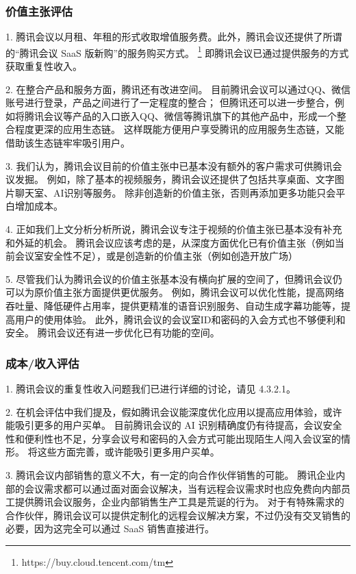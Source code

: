 \documentclass[a4paper,12pt]{article}
\begin{document}
    \subsubsection{价值主张评估}

    1.
    腾讯会议以月租、年租的形式收取增值服务费。此外，腾讯会议还提供了所谓的“腾讯会议 SaaS 版新购”的服务购买方式。
    \footnote{https://buy.cloud.tencent.com/tm}
    即腾讯会议已通过提供服务的方式获取重复性收入。

    2.
    在整合产品和服务方面，腾讯还有改进空间。
    目前腾讯会议可以通过QQ、微信账号进行登录，产品之间进行了一定程度的整合；
    但腾讯还可以进一步整合，例如将腾讯会议等产品的入口嵌入QQ、微信等腾讯旗下的其他产品中，形成一个整合程度更深的应用生态链。
    这样既能方便用户享受腾讯的应用服务生态链，又能借助该生态链牢牢吸引用户。

    3.
    我们认为，腾讯会议目前的价值主张中已基本没有额外的客户需求可供腾讯会议发掘。
    例如，除了基本的视频服务，腾讯会议还提供了包括共享桌面、文字图片聊天室、AI识别等服务。
    除非创造新的价值主张，否则再添加更多功能只会平白增加成本。

    4.
    正如我们上文分析分析所说，腾讯会议专注于视频的价值主张已基本没有补充和外延的机会。
    腾讯会议应该考虑的是，从深度方面优化已有价值主张（例如当前会议室安全性不足），或是创造新的价值主张（例如创造开放广场）

    5.
    尽管我们认为腾讯会议的价值主张基本没有横向扩展的空间了，但腾讯会议仍可以为原价值主张方面提供更优服务。
    例如，腾讯会议可以优化性能，提高网络吞吐量、降低硬件占用率，提供更精准的语音识别服务、自动生成字幕功能等，提高用户的使用体验。
    此外，腾讯会议的会议室ID和密码的入会方式也不够便利和安全。
    腾讯会议还有进一步优化已有功能的空间。

    \subsubsection{成本/收入评估}

    1.
    腾讯会议的重复性收入问题我们已进行详细的讨论，请见 4.3.2.1。

    2.
    在机会评估中我们提及，假如腾讯会议能深度优化应用以提高应用体验，或许能吸引更多的用户买单。
    目前腾讯会议的 AI 识别精确度仍有待提高，会议安全性和便利性也不足，分享会议号和密码的入会方式可能出现陌生人闯入会议室的情形。
    将这些方面完善，或许能吸引更多用户买单。

    3.
    腾讯会议内部销售的意义不大，有一定的向合作伙伴销售的可能。
    腾讯企业内部的会议需求都可以通过面对面会议解决，当有远程会议需求时也应免费向内部员工提供腾讯会议服务，企业内部销售生产工具是荒诞的行为。
    对于有特殊需求的合作伙伴，腾讯会议可以提供定制化的远程会议解决方案，不过仍没有交叉销售的必要，因为这完全可以通过 SaaS 销售直接进行。
\end{document}
